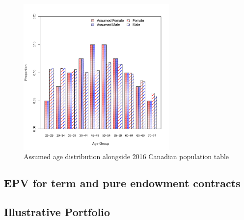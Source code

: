 \documentclass[12pt]{article}
\begin{document}
\begin{appendices}
\begin{figure}[!htpb]
\begin{center}
\vspace{-10mm}
\includegraphics[width=0.7\textwidth]{images/agedistribution}
\end{center}
\vspace{-3mm}
\caption{Assumed age distribution alongside 2016 Canadian population table}
\label{fig:agedistribution}
\end{figure}

\subsection{EPV for term and pure endowment contracts}



\newpage

\subsection{Illustrative Portfolio}



\end{appendices}

\linespread{1.5}


\end{document}
